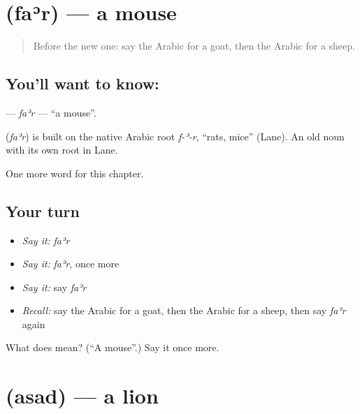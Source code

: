 \section[\texorpdfstring{\ar{فأر} (faʾr)}{فأر (faʾr)}]{ (faʾr) — a mouse}

\label{lesson:AR-C79-far}



\begin{quote}
Before the new one: say the Arabic for a goat, then the Arabic for a sheep.
\end{quote}

\subsection*{You'll want to know: }
\textbf{} — \emph{faʾr} — \textquotedblleft{}a mouse\textquotedblright{}.

\begin{cousinweb}
\textbf{} (\emph{faʾr}) is built on the native Arabic root \emph{f-ʾ-r}, \textquotedblleft{}rats, mice\textquotedblright{} (Lane). An old noun with its own root in Lane.
\end{cousinweb}

\begin{grammarlens}[title={What you've built}]
One more word for this chapter.
\end{grammarlens}

\subsection*{Your turn}
\begin{itemize}
\raggedright
  \item \emph{Say it:} \emph{faʾr}
  \item \emph{Say it:} \emph{faʾr}, once more
  \item \emph{Say it:} say \emph{faʾr}
  \item \emph{Recall:} say the Arabic for a goat, then the Arabic for a sheep, then say \emph{faʾr} again
\end{itemize}

\begin{tcolorbox}[breakable,colback=teal!4,colframe=teal!35!black,title={Before you move on}]
What does  mean? (\textquotedblleft{}A mouse\textquotedblright{}.) Say it once more.
\end{tcolorbox}
\section[\texorpdfstring{\ar{أسد} (asad)}{أسد (asad)}]{ (asad) — a lion}

